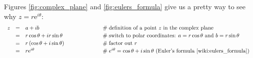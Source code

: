 \documentclass{article}
\theoremstyle{definition}
\begin{document}
\smallskip
\noindent
Figures \ref{fig:complex_plane} and \ref{fig:eulers_formula} give us a pretty 
way to see why $z = r \mathrm{e}^{i\theta}$:
\begin{equation*}
\begin{array}{lllll}
z
&=& a + ib
                &\hspace{6em} \mathrel{\#} \text{definition of a point $z$ in the complex plane} \\ 
[2pt]
&=&  r \cos \theta + i r \sin \theta
                &\hspace{6em}\mathrel{\#} \text{switch to polar coordinates: $a = r \cos
				\theta$ and $b = r \sin \theta$} \\ 
[2pt]
&=&  r \left ( \cos \theta +i \sin \theta \right )
                &\hspace{6em}\mathrel{\#} \text{factor out  $r$} \\ 
[2pt]
&=& r \mathrm{e}^{i\theta}
                &\hspace{6em}\mathrel{\#}\text{$e^{i\theta} = \cos \theta + i \sin \theta$
				(Euler's formula \cite{wiki:eulers_formula})} 
\end{array}
\end{equation*}
\end{document}
